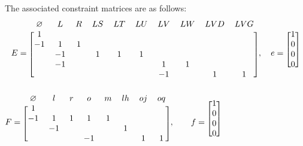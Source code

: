 \documentclass[11pt]{tufte-handout}
\theoremstyle{plain}
\theoremstyle{definition}
\theoremstyle{remark}
\begin{document}
The associated constraint matrices are as follows:
$$ E = \begin{blockarray}{c c c c c c c c c c c}
            \varnothing & L & R & LS & LT & LU & LV & LW & LVD & LVG \\
            \begin{block}{[c c c c c c c c c c c]}
                1 &    &   &   &  &&  &\\
               -1 & 1  & 1 &  &  & & &\\
                  & -1 &   &  1 & 1 & 1   & \\
                  & -1 & & &   &  & 1 & 1 \\
                  &  & & &   &  & -1 & & 1& 1 \\
            \end{block}
            \end{blockarray},\quad
        e = \begin{blockarray}{[c]}
                1 \\
                0 \\
                0 \\
                0 \\
            \end{blockarray}
$$
\newline
$
    F = \begin{blockarray}{c c c c c c c c c}
            \varnothing & l & r & o & m & lh & oj & oq \\
            \begin{block}{[c c c c c c c c c]}
                1 &    &  \\
               -1 & 1  & 1 & 1 & 1 & \\
                & -1 & & & & 1 \\
                & & & -1 & & & 1 & 1 \\
            \end{block}
            \end{blockarray}, \quad\quad
    f = \begin{blockarray}{[c]}
                1 \\
                0 \\
                0 \\
                0 \\
            \end{blockarray}
$
\end{document}
